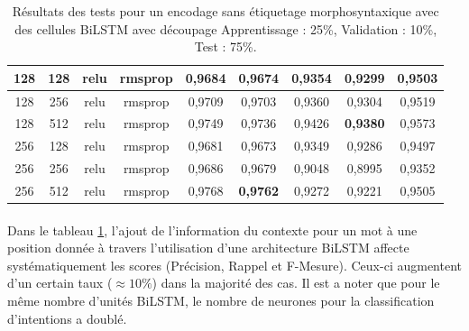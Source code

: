 \begin{table}[H]
{\begin{tabular}{|c|c|c|c|c|c|c|c|c|}
				128 & 128 & relu & rmsprop & 0,9684 & 0,9674 & 0,9354 & 0,9299 & \textbf{0,9503} \\ \hline
				128 & 256 & relu & rmsprop & 0,9709 & 0,9703 & 0,9360 & 0,9304 & 0,9519 \\ \hline
				128 & 512 & relu & rmsprop & 0,9749 & 0,9736 & 0,9426 & \textbf{0,9380} & 0,9573 \\ \hline
				256 & 128 & relu & rmsprop & 0,9681 & 0,9673 & 0,9349 & 0,9286 & 0,9497 \\ \hline
				256 & 256 & relu & rmsprop & 0,9686 & 0,9679 & 0,9048 & 0,8995 & 0,9352 \\ \hline
				256 & 512 & relu & rmsprop & 0,9768 & \textbf{0,9762} & 0,9272 & 0,9221 & 0,9505 \\ \hline
			\end{tabular}%
		}
		\caption{Résultats des tests pour un encodage sans étiquetage morphosyntaxique avec des cellules BiLSTM avec découpage Apprentissage : 25\%, Validation : 10\%, Test : 75\%.}
		\label{tab:bilstm_1}
	\end{table}
	
	\paragraph{}
	Dans le tableau \ref{tab:bilstm_1}, l'ajout de l'information du contexte pour un mot à une position donnée à travers l'utilisation d'une architecture BiLSTM affecte systématiquement les scores (Précision, Rappel et F-Mesure). Ceux-ci augmentent d'un certain taux ($\approx 10\%$) dans la majorité des cas. Il est a noter que pour le même nombre d'unités BiLSTM, le nombre de neurones pour la classification d'intentions a doublé.
	
	
	
